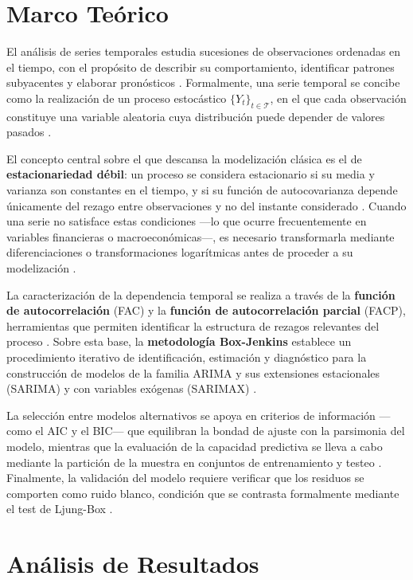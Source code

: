 \documentclass[12pt, a4paper]{article}
\begin{document}
\newpage
\section{Marco Teórico}

El análisis de series temporales estudia sucesiones de observaciones ordenadas en el tiempo, con el propósito de describir su comportamiento, identificar patrones subyacentes y elaborar pronósticos \cite{box2008}. Formalmente, una serie temporal se concibe como la realización de un proceso estocástico $\{Y_t\}_{t \in \mathcal{T}}$, en el que cada observación constituye una variable aleatoria cuya distribución puede depender de valores pasados \cite{hamilton1994}.

El concepto central sobre el que descansa la modelización clásica es el de \textbf{estacionariedad débil}: un proceso se considera estacionario si su media y varianza son constantes en el tiempo, y si su función de autocovarianza depende únicamente del rezago entre observaciones y no del instante considerado \cite{pena2010}. Cuando una serie no satisface estas condiciones ---lo que ocurre frecuentemente en variables financieras o macroeconómicas---, es necesario transformarla mediante diferenciaciones o transformaciones logarítmicas antes de proceder a su modelización \cite{enders2009}.

La caracterización de la dependencia temporal se realiza a través de la \textbf{función de autocorrelación} (FAC) y la \textbf{función de autocorrelación parcial} (FACP), herramientas que permiten identificar la estructura de rezagos relevantes del proceso \cite{chatfield2019}. Sobre esta base, la \textbf{metodología Box-Jenkins} establece un procedimiento iterativo de identificación, estimación y diagnóstico para la construcción de modelos de la familia ARIMA y sus extensiones estacionales (SARIMA) y con variables exógenas (SARIMAX) \cite{box2008, hyndman2018}.

La selección entre modelos alternativos se apoya en criterios de información ---como el AIC y el BIC--- que equilibran la bondad de ajuste con la parsimonia del modelo, mientras que la evaluación de la capacidad predictiva se lleva a cabo mediante la partición de la muestra en conjuntos de entrenamiento y testeo \cite{diebold2007}. Finalmente, la validación del modelo requiere verificar que los residuos se comporten como ruido blanco, condición que se contrasta formalmente mediante el test de Ljung-Box \cite{cryer2008}.

\newpage
\section{Análisis de Resultados}
\end{document}
